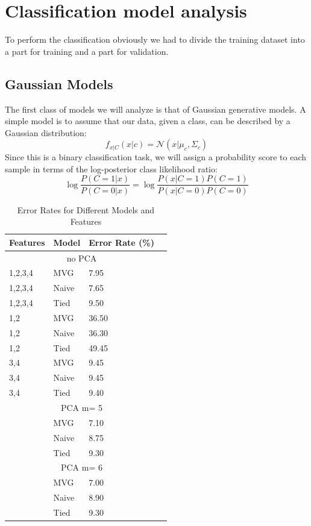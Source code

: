 \documentclass{article}
\begin{document}
\section{Classification model analysis}
To perform the classification obviously we had to divide the training dataset into a part for training and a part for validation.
\subsection{Gaussian Models}
The first class of models we will analyze is that of Gaussian generative models. A simple model is to assume that our data, given a class, can be described by a Gaussian distribution:
\begin{equation}
    f_{x|C}(x|c) = \mathcal{N}(x|\mu_c,\Sigma_c)
\end{equation}
Since this is a binary classification task, we will assign a probability score to each sample in terms of the log-posterior class likelihood ratio:
\begin{equation}
    \log \frac{P(C=1|x)}{P(C=0|x)} = \log \frac{P(x|C=1)P(C=1)}{P(x|C=0)P(C=0)}
\end{equation}
\begin{table}[H]
    \centering
    \caption{Error Rates for Different Models and Features}
    \label{tab:error_rates}
    \begin{tabular}{lllr}
    \hline
    \textbf{Features} & \textbf{Model} & \textbf{Error Rate (\%)} \\
    \hline
    \multicolumn{3}{c}{no PCA} \\
    \hline
    1,2,3,4 & MVG & 7.95 \\
    1,2,3,4 & Naive &  7.65 \\
    1,2,3,4 & Tied &  9.50 \\
    \hline
    1,2 & MVG &  36.50 \\
    1,2 & Naive &  36.30 \\
    1,2 & Tied &  49.45 \\
    \hline
    3,4 & MVG &  9.45 \\
    3,4 & Naive &  9.45 \\
    3,4 & Tied &  9.40 \\
    \hline
    \multicolumn{3}{c}{PCA m= 5} \\
    \hline
    & MVG & 7.10 \\
    & Naive & 8.75 \\
    & Tied &  9.30 \\
    \hline
    \multicolumn{3}{c}{PCA m= 6} \\
    \hline
    & MVG &  7.00 \\
    & Naive &  8.90 \\
    & Tied &  9.30 \\
    \hline
    \end{tabular}
    \end{table}
\end{document}
